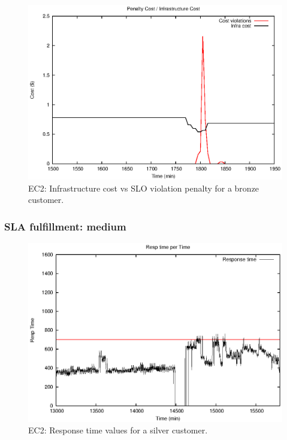 \begin{figure}
  \begin{center}
    \includegraphics[width=.85\linewidth]{images/exps2011/low/ec2/penaltyVScost_filtered.eps}
  \end{center}
\vspace{-5mm}
  \caption{EC2: Infrastructure cost vs SLO violation penalty for a bronze customer.}
  \label{lowPenalty}
\end{figure}

\subsubsection{SLA fulfillment: medium}

\begin{figure}
  \begin{center}
    \includegraphics[width=.85\linewidth]{images/exps2011/medium/ec2/proxyDataPoints_output_filtered.eps}
  \end{center}
\vspace{-5mm}
  \caption{EC2: Response time values for a silver customer.}
  \label{zoomOutage}
\end{figure}

